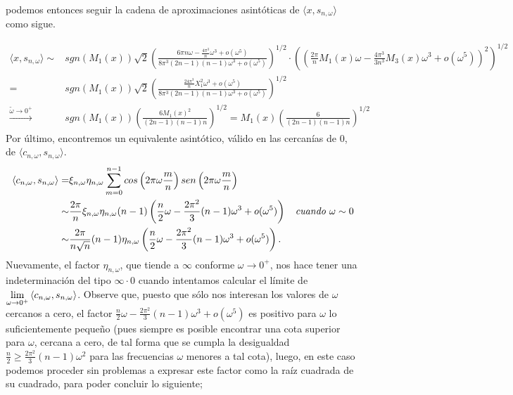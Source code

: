 \noindent
podemos entonces seguir la cadena de
aproximaciones asintóticas de $\langle x, s_{n, \omega} \rangle$ 
como sigue.

\begin{align*}
\langle x,
s_{n, \omega}
\rangle \sim &
sgn(M_{1}(x))
\sqrt{2} 
\left(
\frac{
6 \pi n \omega -
\frac{4 \pi^{3}}{n} \omega^{3} + o(\omega^{5})
}{8 \pi^{3} (2n-1)(n-1)\omega^{3} + o(\omega^{5})
}
\right)^{1/2}
\cdot 
\left(
\left(
\frac{2 \pi}{n} M_{1}(x) \omega - \frac{4 \pi^{3}}{3n^{3}}M_{3}(x) \omega^{3} 
 + o(\omega^{5})
\right)^{2}
\right)^{1/2}\\
= & 
sgn(M_{1}(x)) \sqrt{2} \left(
\frac{
\frac{24 \pi^{3}}{n}X_{1}^{2}\omega^{3} + o(\omega^{5}) }{
8 \pi^{3} (2n-1)(n-1)\omega^{3} + o(\omega^{5})
}
\right)^{1/2} \\
\xrightarrow{\tilde{\omega} \rightarrow 0^{+}}& sgn(M_{1}(x))\left(
\frac{6 M_{1}(x)^{2}}{(2n-1)(n-1)n}
\right)^{1/2} 
= M_{1}(x) 
\left(
\frac{6 }{(2n-1)(n-1)n}
\right)^{1/2} 
\end{align*}
Por último, encontremos un equivalente
asintótico, válido en las cercanías de $0$, de 
$\langle
c_{n, \omega}, s_{n, \omega}
\rangle $.
\begin{align*}
\langle
c_{n, \omega}, s_{n, \omega}
\rangle = &
\xi_{n, \omega} \eta_{n, \omega}
\sum\limits_{m=0}^{n-1}
cos\left(
2 \pi \omega\frac{m}{n}
\right)
sen\left(
2 \pi \omega\frac{m}{n}
\right)
 \\
\sim &
\frac{2\pi}{n}
\xi_{n, \omega} \eta_{n, \omega}
(n-1)  
\left(
\frac{n}{2} \omega - \frac{2\pi^{2}}{3} (n-1) \omega^{3} + o(\omega^{5})
\right) 
\hspace{0.2cm} \textit{ cuando } \omega \sim 0
\\
\sim &
\frac{2\pi}{n \sqrt{n}}
(n-1) 
\eta_{n, \omega} 
\left(
\frac{n}{2} \omega - \frac{2\pi^{2}}{3} (n-1) \omega^{3} + o(\omega^{5})
\right). \\
\end{align*}
Nuevamente, el factor 
$\eta_{n, \omega}$, que tiende a $\infty$
conforme $\omega \rightarrow 0^{+}$,
nos hace tener una indeterminación
del tipo $\infty \cdot 0$
cuando intentamos calcular el límite
de 
$
\lim\limits_{\omega \rightarrow 0^{+}}{
\langle
c_{n, \omega}, s_{n, \omega}
\rangle}
$.
Observe que, puesto que sólo nos interesan los valores
de $\omega$ cercanos a cero, el factor 
$
\frac{n}{2} \omega - \frac{2\pi^{2}}{3} (n-1) \omega^{3} + o(\omega^{5})
$
es positivo 
para $\omega$ lo suficientemente pequeño
(pues siempre es posible encontrar una cota
superior para $\omega$, cercana a cero, de tal forma que se 
cumpla la desigualdad $\frac{n}{2} \geq \frac{2 \pi^{2}}{3}(n-1)
\omega^{2}$ para las frecuencias $\omega$ menores a tal cota), luego, 
en este caso podemos proceder sin problemas a expresar este
factor
como la raíz cuadrada de su cuadrado, para poder concluir lo siguiente; 


